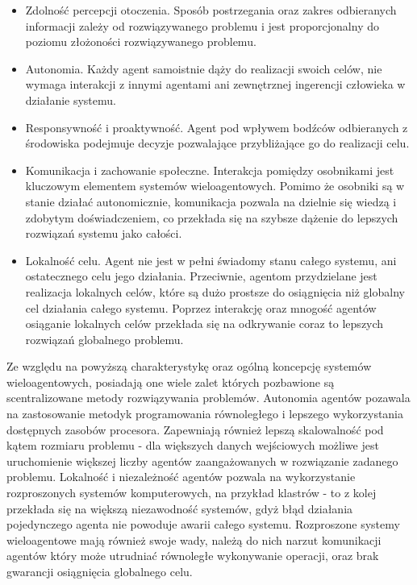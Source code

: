 {{        \begin{itemize}
            \item Zdolność percepcji otoczenia. Sposób postrzegania oraz zakres odbieranych informacji zależy od
            rozwiązywanego problemu i jest proporcjonalny do poziomu złożoności rozwiązywanego problemu.
            \item Autonomia. Każdy agent samoistnie dąży do realizacji swoich celów, nie wymaga interakcji z innymi
            agentami ani zewnętrznej ingerencji człowieka w działanie systemu.
            \item Responsywność i proaktywność. Agent pod wpływem bodźców odbieranych z środowiska podejmuje decyzje
            pozwalające przybliżające go do realizacji celu.
            \item Komunikacja i zachowanie społeczne. Interakcja pomiędzy osobnikami jest kluczowym elementem systemów
            wieloagentowych. Pomimo że osobniki są w stanie działać autonomicznie, komunikacja pozwala na dzielnie się
            wiedzą i zdobytym doświadczeniem, co przekłada się na szybsze dążenie do lepszych rozwiązań systemu jako
            całości.
            \item Lokalność celu. Agent nie jest w pełni świadomy stanu całego systemu, ani ostatecznego celu jego
            działania. Przeciwnie, agentom przydzielane jest realizacja lokalnych celów, które są dużo prostsze do
            osiągnięcia niż globalny cel działania całego systemu. Poprzez interakcję oraz mnogość agentów osiąganie
            lokalnych celów przekłada się na odkrywanie coraz to lepszych rozwiązań globalnego problemu.
        \end{itemize}

        Ze względu na powyższą charakterystykę oraz ogólną koncepcję systemów wieloagentowych, posiadają one wiele zalet
        których pozbawione są scentralizowane metody rozwiązywania problemów. Autonomia agentów pozawala na zastosowanie
        metodyk programowania równoległego i lepszego wykorzystania dostępnych zasobów procesora. Zapewniają również
        lepszą skalowalność pod kątem rozmiaru problemu - dla większych danych wejściowych możliwe jest uruchomienie
        większej liczby agentów zaangażowanych w rozwiązanie zadanego problemu. Lokalność i niezależność agentów pozwala
        na wykorzystanie rozproszonych systemów komputerowych, na przykład klastrów - to z kolej przekłada się na
        większą niezawodność systemów, gdyż błąd działania pojedynczego agenta nie powoduje awarii całego systemu.
        Rozproszone systemy wieloagentowe mają również swoje wady, należą do nich narzut komunikacji agentów który może
        utrudniać równoległe wykonywanie operacji, oraz brak gwarancji osiągnięcia globalnego
        celu\cite{Dorri2018MultiAgentSA, Balaji2010AnIT}.

}}
